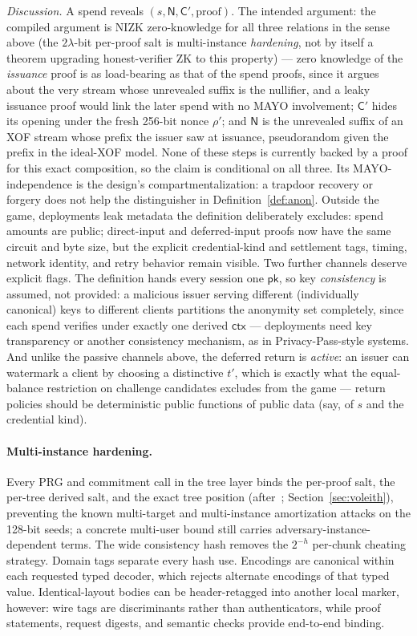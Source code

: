 \documentclass[11pt]{article}
\newcommand{\ctx}{\mathsf{ctx}}
\newcommand{\Cred}{\mathsf{C}}
\newcommand{\Null}{\mathsf{N}}
\begin{document}
\noindent\emph{Discussion.}
A spend reveals $(s, \Null, \Cred', \text{proof})$. The intended argument:
the compiled argument is NIZK zero-knowledge for all three relations in
the sense above (the $2\lambda$-bit per-proof salt is multi-instance
\emph{hardening}, not by itself a theorem upgrading honest-verifier ZK to
this property) --- zero knowledge of the \emph{issuance} proof is as
load-bearing as that of the spend proofs, since it argues about the very
stream whose unrevealed suffix is the nullifier, and a leaky issuance
proof would link the later spend with no MAYO involvement; $\Cred'$
hides its opening under the fresh 256-bit nonce $\rho'$; and $\Null$ is
the unrevealed suffix of an XOF stream whose prefix the issuer saw at
issuance, pseudorandom given the prefix in the ideal-XOF model. None of
these steps is currently backed by a proof for this exact composition, so
the claim is conditional on all three. Its MAYO-independence is the design's compartmentalization: a
trapdoor recovery or forgery does not help the distinguisher in
Definition~\ref{def:anon}. Outside the game, deployments leak metadata the
definition deliberately excludes: spend amounts are public; direct-input
and deferred-input proofs now have the same circuit and byte size, but the
explicit credential-kind and settlement tags, timing, network identity, and
retry behavior remain visible. Two further channels
deserve explicit flags. The definition hands every session one
$\mathsf{pk}$, so key \emph{consistency} is assumed, not provided: a
malicious issuer serving different (individually canonical) keys to
different clients partitions the anonymity set completely, since each
spend verifies under exactly one derived $\ctx$ --- deployments need key
transparency or another consistency mechanism, as in Privacy-Pass-style
systems. And unlike the passive channels above, the deferred return is
\emph{active}: an issuer can watermark a client by choosing a distinctive
$t'$, which is exactly what the equal-balance restriction on challenge
candidates excludes from the game --- return policies should be
deterministic public functions of public data (say, of $s$ and the
credential kind).

\paragraph{Multi-instance hardening.}
Every PRG and commitment call in the tree layer binds the per-proof
salt, the per-tree derived salt, and the exact tree position
(after~\cite{OneTree}; Section~\ref{sec:voleith}), preventing the known
multi-target and multi-instance amortization attacks on the 128-bit
seeds; a concrete multi-user bound
still carries adversary-instance-dependent terms. The wide consistency hash
removes the $2^{-h}$ per-chunk cheating strategy. Domain tags separate every
hash use. Encodings are canonical within each requested typed decoder, which
rejects alternate encodings of that typed value. Identical-layout bodies can
be header-retagged into another local marker, however: wire tags are
discriminants rather than authenticators, while proof statements, request
digests, and semantic checks provide end-to-end binding.
\end{document}
